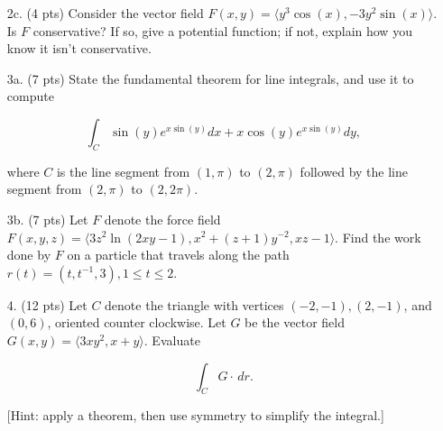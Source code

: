 \documentclass[12 pt]{report}
\begin{document}
\begin{enumerate}
\item[2c.] (4 pts) Consider the vector field $F(x,y) = \langle y^3 \cos(x), - 3y^2 \sin(x) \rangle$. Is $F$ conservative? If so, give a potential function; if not, explain how you know it isn't conservative. 

\newpage

\item[3a.] (7 pts) State the fundamental theorem for line integrals, and use it to compute 

$$\int_C \sin(y) e^{x \sin(y)} dx + x \cos(y) e^{x \sin(y)} dy,$$

where $C$ is the line segment from $(1,\pi)$ to $(2,\pi)$ followed by the line segment from $(2,\pi)$ to $(2,2 \pi)$. 

\vspace{7cm}  

\item[3b.] (7 pts) Let $F$ denote the force field $F(x,y,z) = \langle 3z^2 \ln (2xy-1), x^2+(z+1)y^{-2}, xz-1 \rangle$. Find the work done by $F$ on a particle that travels along the path $r(t) = (t, t^{-1}, 3), 1 \leq t \leq 2$. 


\newpage

\item[4.] (12 pts) Let $C$ denote the triangle with vertices $(-2,-1), (2,-1)$, and $(0,6)$, oriented counter clockwise. Let $G$ be the vector field $G(x,y) = \langle 3xy^2, x+y \rangle.$ Evaluate

\[
\int_C G \cdot \, dr.
\]

[Hint: apply a theorem, then use symmetry to simplify the integral.]

\end{enumerate}
\end{document}
